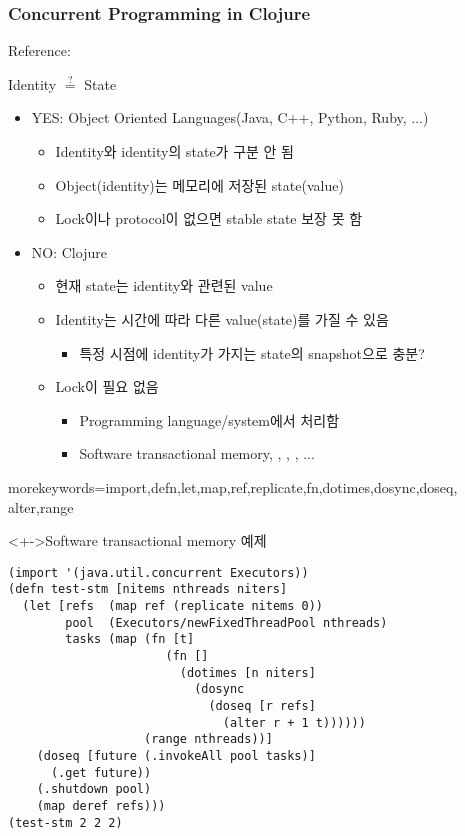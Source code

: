 \begin{frame}
\frametitle{Concurrent Programming in Clojure}
Reference: 

\begin{center}
Identity $\stackrel{?}{=}$ State
\end{center}

\begin{itemize}
\item YES: Object Oriented Languages(Java, C++, Python, Ruby, ...)
  \begin{itemize}
  \item Identity와 identity의 state가 구분 안 됨
  \item Object(identity)는 메모리에 저장된 state(value)
  \item Lock이나 protocol이 없으면 stable state 보장 못 함
  \end{itemize}
\item NO: Clojure
  \begin{itemize}
  \item 현재 state는 identity와 관련된 value
  \item Identity는 시간에 따라 다른 value(state)를 가질 수 있음
    \begin{itemize}
    \item 특정 시점에 identity가 가지는 state의 snapshot으로 충분?
    \end{itemize}
  \item Lock이 필요 없음
    \begin{itemize}
    \item Programming language/system에서 처리함
    \item Software transactional memory, , , , ...
    \end{itemize}
  \end{itemize}
\end{itemize}

    {morekeywords={import,defn,let,map,ref,replicate,fn,dotimes,dosync,doseq,
                   alter,range}
    }
\begin{block}<+->{Software transactional memory 예제}
\begin{lstlisting}
(import '(java.util.concurrent Executors))
(defn test-stm [nitems nthreads niters]
  (let [refs  (map ref (replicate nitems 0))
        pool  (Executors/newFixedThreadPool nthreads)
        tasks (map (fn [t]
                      (fn []
                        (dotimes [n niters]
                          (dosync
                            (doseq [r refs]
                              (alter r + 1 t))))))
                   (range nthreads))]
    (doseq [future (.invokeAll pool tasks)]
      (.get future))
    (.shutdown pool)
    (map deref refs)))
(test-stm 2 2 2)
\end{lstlisting}
\end{block}


\end{frame}
